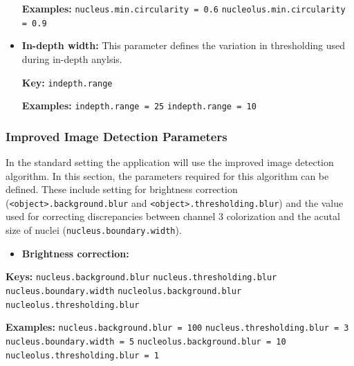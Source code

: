 \documentclass[a4paper, 11pt]{article}
\newcommand{\code}[1]{\colorbox{codegray}{\texttt{#1}}}
\begin{document}
\begin{itemize}
  \textbf{Examples:}
  \newline \code{nucleus.min.circularity = 0.6}
  \newline \code{nucleolus.min.circularity = 0.9}
  
  \item \textbf{In-depth width:} This parameter defines the variation in
  thresholding used during in-depth anylsis.
  
  \textbf{Key:}
  \newline \code{indepth.range}
  
  \textbf{Examples:}
  \newline \code{indepth.range = 25}
  \newline \code{indepth.range = 10}
  
\end{itemize}

\subsubsection{Improved Image Detection Parameters}
In the standard setting the application will use the improved image detection
algorithm. In this section, the parameters required for this algorithm can be
defined. These include setting for brightness correction
(\code{<object>.background.blur} and \code{<object>.thresholding.blur}) and the
value used for correcting discrepancies between channel 3 colorization and the
acutal size of nuclei (\code{nucleus.boundary.width}).

\begin{itemize}
  \item \textbf{Brightness correction:}
\end{itemize}

\textbf{Keys:}
\newline \code{nucleus.background.blur}
\newline \code{nucleus.thresholding.blur}
\newline \code{nucleus.boundary.width}
\newline \code{nucleolus.background.blur}
\newline \code{nucleolus.thresholding.blur}

\textbf{Examples:}
\newline \code{nucleus.background.blur = 100}
\newline \code{nucleus.thresholding.blur = 3}
\newline \code{nucleus.boundary.width = 5}
\newline \code{nucleolus.background.blur = 10}
\newline \code{nucleolus.thresholding.blur = 1}
\end{document}
